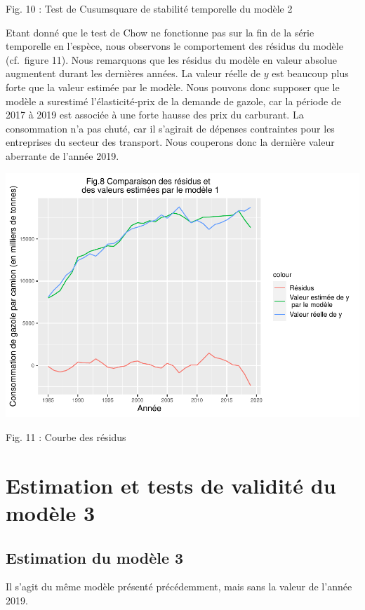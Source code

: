 \documentclass[
]{article}
\begin{document}
Fig. 10 : Test de Cusumsquare de stabilité temporelle du modèle 2

Etant donné que le test de Chow ne fonctionne pas sur la fin de la série
temporelle en l'espèce, nous observons le comportement des résidus du
modèle (cf.~figure 11). Nous remarquons que les résidus du modèle en
valeur absolue augmentent durant les dernières années. La valeur réelle
de \(y\) est beaucoup plus forte que la valeur estimée par le modèle.
Nous pouvons donc supposer que le modèle a surestimé l'élasticité-prix
de la demande de gazole, car la période de 2017 à 2019 est associée à
une forte hausse des prix du carburant. La consommation n'a pas chuté,
car il s'agirait de dépenses contraintes pour les entreprises du secteur
des transport. Nous couperons donc la dernière valeur aberrante de
l'année 2019.

\begin{center}\includegraphics[width=0.7\linewidth,height=0.7\textheight]{Projet_econometrie_II_files/figure-latex/unnamed-chunk-12-1} \end{center}

Fig. 11 : Courbe des résidus

\hypertarget{estimation-et-tests-de-validituxe9-du-moduxe8le-3}{%
\section{Estimation et tests de validité du modèle
3}\label{estimation-et-tests-de-validituxe9-du-moduxe8le-3}}

\hypertarget{estimation-du-moduxe8le-3}{%
\subsection{Estimation du modèle 3}\label{estimation-du-moduxe8le-3}}

Il s'agit du même modèle présenté précédemment, mais sans la valeur de
l'année 2019.
\end{document}
